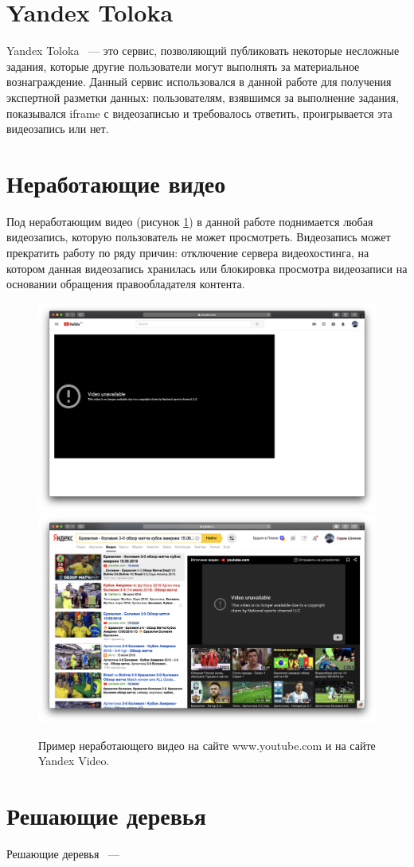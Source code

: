 \section{Yandex Toloka}

Yandex Toloka \cite{Toloka}~--- это сервис, позволяющий публиковать некоторые несложные задания, которые другие пользователи могут выполнять за материальное вознаграждение. Данный сервис использовался в данной работе для получения экспертной разметки данных: пользователям, взявшимся за выполнение задания, показывался iframe с видеозаписью и требовалось ответить, проигрывается эта видеозапись или нет.

\section{Неработающие видео}

Под неработающим видео (рисунок \ref{fig:bad_video}) в данной работе поднимается любая видеозапись, которую пользователь не может просмотреть. Видеозапись может прекратить работу по ряду причин: отключение сервера видеохостинга, на котором данная видеозапись хранилась или блокировка просмотра видеозаписи на основании обращения правообладателя контента.

\begin{figure}
    \centering
    \includegraphics[width=\textwidth]{../images/youtube_bad.png}
    \includegraphics[width=\textwidth]{../images/yandex_video_bad.png}
    \caption{Пример неработающего видео на сайте www.youtube.com и на сайте Yandex Video.}
    \label{fig:bad_video}
\end{figure}

\section{Решающие деревья}

Решающие деревья \cite{Breiman2017}~---